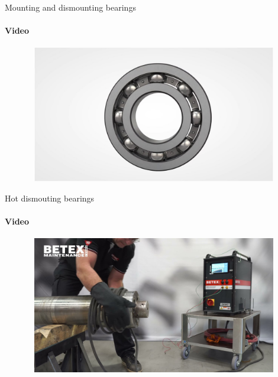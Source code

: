 \documentclass[aspectratio=169]{beamer}
\begin{document}
\begin{frame}[t]{Mounting and dismounting bearings}
    \framesubtitle{Video}
    \vspace{-0.6cm}
    \begin{figure}[H]
        \href{https://youtu.be/n9zWjmodm8k}{
            \centering\includegraphics[height=6cm,width=1\textwidth,keepaspectratio]{mount_video.jpg}}
        \label{fig:mount_video.jpg}
    \end{figure}
\end{frame}

\begin{frame}[t]{Hot dismouting bearings}
    \framesubtitle{Video}
    \vspace{-0.6cm}
    \begin{figure}[H]
        \href{https://youtu.be/FgkzwS05R9E}{
            \centering\includegraphics[height=6cm,width=1\textwidth,keepaspectratio]{hotdismount_video.jpg}}
        \label{fig:hotdismount_video.jpg}
    \end{figure}
\end{frame}
\end{document}

